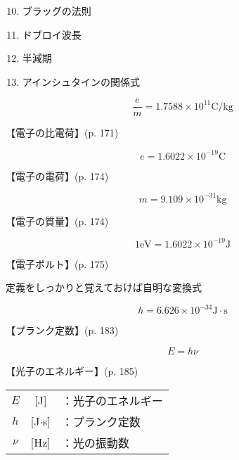 \documentclass[10pt]{jarticle}
\begin{document}
\newpage
\addtocounter{page}{-1}
\thispagestyle{empty}

\vspace*{-10mm}
\begin{enumerate}
\setcounter{enumi}{9}
\small
\itemsep-4mm
\item ブラッグの法則 \\
\item ドブロイ波長 \\
\item 半減期 \\
\item アインシュタインの関係式
\end{enumerate}




\newpage
\[
  \frac{e}{m} = 1.7588 \! \times \! 10^{11}  \mathrm{C/kg}
\]


\vskip3mm
\noindent
【電子の比電荷】{\footnotesize (p. 171)}


\newpage
\[
  e = 1.6022 \! \times \! 10^{-19}  \mathrm{C}
\]


\vskip3mm
\noindent
【電子の電荷】{\footnotesize (p. 174)}




\newpage
\[
  m = 9.109 \! \times \! 10^{-31}  \mathrm{kg}
\]

\vskip3mm
\noindent
【電子の質量】{\footnotesize (p. 174)}




\newpage
\[
  1\mathrm{eV} = 1.6022\! \times\! 10^{-19} \mathrm{J}
\]

\vskip3mm
\noindent
【電子ボルト】{\footnotesize (p. 175)}

定義をしっかりと覚えておけば自明な変換式




\newpage
\[
  h = 6.626 \! \times \! 10^{-34}  \mathrm{J\! \cdot\! s}
\]

\vskip3mm
\noindent
【プランク定数】{\footnotesize (p. 183)}





\newpage
\[
E = h \nu
\]


\vskip3mm
\noindent
【光子のエネルギー】{\footnotesize (p. 185)}

\begin{tabular}{ccl}
$E$	&[J]	&：光子のエネルギー \\
  $h$	&{[J$\cdot$s]}	&：プランク定数 \\
$\nu$	&[Hz]	&：光の振動数
\end{tabular}
\end{document}
